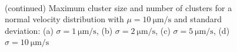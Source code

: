 \documentclass[../../master_thesis_np.tex]{subfiles}
\begin{document}
		\begin{figure}
			\centering
			\ContinuedFloat
			\\
			
			\caption{(continued) Maximum cluster size and number of clusters for a normal velocity distribution with $\mu = \SI{10}{\um\per\second}$ and standard deviation: (a) $\sigma = \SI{1}{\um\per\second}$, (b) $\sigma = \SI{2}{\um\per\second}$, (c) $\sigma = \SI{5}{\um\per\second}$, (d) $\sigma = \SI{10}{\um\per\second}$}
			\label{fig:lj_vdist_clust}
		\end{figure}
		
\end{document}

